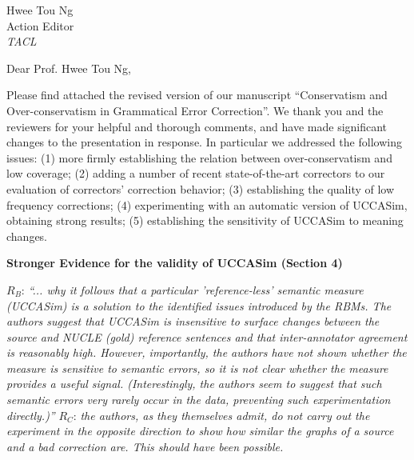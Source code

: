 \documentclass[11pt,letterpaper]{letter}
\begin{document}
\begin{letter}{%
Hwee Tou Ng\\
Action Editor\\
{\em TACL}\\
}



\vspace{.5cm}

  \opening{Dear Prof. Hwee Tou Ng,}


\vspace{.5cm}
  
  Please find attached the revised version of our manuscript ``Conservatism and Over-conservatism in Grammatical Error Correction''. We thank you and the reviewers for your helpful and thorough comments, and have made significant changes to the presentation in response. In particular we addressed the following issues: (1) more firmly establishing the relation between over-conservatism and low coverage; (2) adding a number of recent state-of-the-art correctors to our evaluation of correctors' correction behavior; (3) establishing the quality of low frequency corrections; (4) experimenting with an automatic version of UCCASim, obtaining strong results; (5) establishing the sensitivity of UCCASim to meaning changes.

\vspace{.5cm}


{\large\bf Stronger Evidence for the validity of UCCASim (Section 4)}

$R_B$: \emph{``... why it follows that a
	particular 'reference-less' semantic measure (UCCASim) is a solution to the
	identified issues introduced by the RBMs. The authors suggest that UCCASim
	is insensitive to surface changes between the source and NUCLE (gold)
	reference sentences and that inter-annotator agreement is reasonably high.
	However, importantly, the authors have not shown whether the measure is
	sensitive to semantic errors, so it is not clear whether the measure
	provides a useful signal. (Interestingly, the authors seem to suggest that
	such semantic errors very rarely occur in the data, preventing such
	experimentation directly.)''
}
$R_C$: \emph{the authors, as they themselves admit, do not carry out the experiment in the opposite direction to show how similar the graphs of a source and a bad correction are.  This should have been possible.}


\end{letter}
\end{document}
